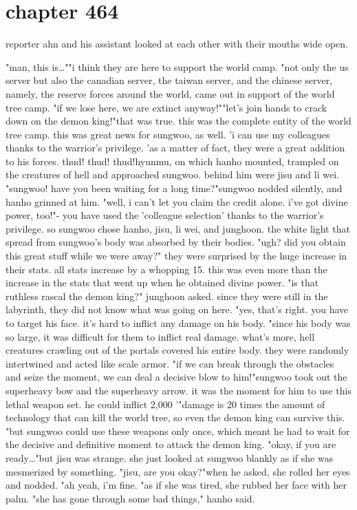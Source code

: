 \section{chapter 464}

reporter ahn and his assistant looked at each other with their mouths wide open.





"man, this is…""i think they are here to support the world camp.
"not only the us server but also the canadian server, the taiwan server, and the chinese server, namely, the reserve forces around the world, came out in support of the world tree camp.
"if we lose here, we are extinct anyway!""let's join hands to crack down on the demon king!"that was true.
 this was the complete entity of the world tree camp.
this was great news for sungwoo, as well.
'i can use my colleagues thanks to the warrior's privilege.
'as a matter of fact, they were a great addition to his forces.
thud! thud! thud!hyunmu, on which hanho mounted, trampled on the creatures of hell and approached sungwoo.
 behind him were jisu and li wei.
"sungwoo! have you been waiting for a long time?"sungwoo nodded silently, and hanho grinned at him.
"well, i can't let you claim the credit alone.
 i've got divine power, too!"- you have used the 'colleague selection' thanks to the warrior's privilege.
so sungwoo chose hanho, jisu, li wei, and junghoon.
the white light that spread from sungwoo's body was absorbed by their bodies.
"ugh? did you obtain this great stuff while we were away?"
they were surprised by the huge increase in their stats.
 all stats increase by a whopping 15.
 this was even more than the increase in the stats that went up when he obtained divine power.
"is that ruthless rascal the demon king?" junghoon asked.
since they were still in the labyrinth, they did not know what was going on here.
"yes, that's right.
 you have to target his face.
 it's hard to inflict any damage on his body.
"since his body was so large, it was difficult for them to inflict real damage.
what's more, hell creatures crawling out of the portals covered his entire body.
they were randomly intertwined and acted like scale armor.
"if we can break through the obstacles and seize the moment, we can deal a decisive blow to him!"sungwoo took out the superheavy bow and the superheavy arrow.
 it was the moment for him to use this lethal weapon set.
 he could inflict 2,000%
'"damage is 20 times the amount of technology that can kill the world tree, so even the demon king can survive this.
"but sungwoo could use these weapons only once, which meant he had to wait for the decisive and definitive moment to attack the demon king.
"okay, if you are ready…"but jisu was strange.
 she just looked at sungwoo blankly as if she was mesmerized by something.
"jisu, are you okay?"when he asked, she rolled her eyes and nodded.
"ah yeah, i'm fine.
"as if she was tired, she rubbed her face with her palm.
"she has gone through some bad things," hanho said.

